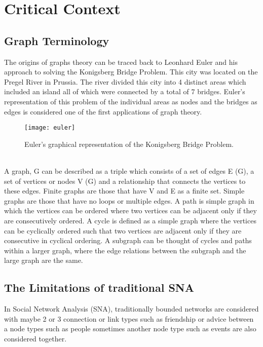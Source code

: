 \chapter{Critical Context}

\section{Graph Terminology}
The origins of graphs theory can be traced back to Leonhard Euler and his approach to solving the Konigsberg Bridge Problem. This city was located on the Pregel River in Prussia. The river divided this city into 4 distinct areas which included an island all of which were connected by a total of 7 bridges. Euler’s representation of this problem of the individual areas as nodes and the bridges as edges is considered one of the first applications of graph theory.\cite{Dickson2006}

\begin{figure}[h]
    \centering
    \texttt{[image: euler]}
    \caption{Euler’s graphical representation of the Konigsberg Bridge Problem.}
    \label{fig:Konigsberg Bridge Problem.}
\end{figure}

\\
A graph, G can be described as a triple which consists of a set of edges E (G), a set of vertices or nodes V (G) and a relationship that connects the vertices to these edges. Finite graphs are those that have V and E as a finite set. Simple graphs are those that have no loops or multiple edges. A path is simple graph in which the vertices can be ordered where two vertices can be adjacent only if they are consecutively ordered. A cycle is defined as a simple graph where the vertices can be cyclically ordered such that two vertices are adjacent only if they are consecutive in cyclical ordering. A subgraph can be thought of cycles and paths within a larger graph, where the edge relations between the subgraph and the large graph are the same. \cite{Dickson2006}\\

\section{The Limitations of traditional SNA}

In Social Network Analysis (SNA), traditionally bounded networks are considered with maybe 2 or 3 connection or link types such as friendship or advice between a node types such as people sometimes another node type such as events are also considered together. \cite{Carley2001}\\

